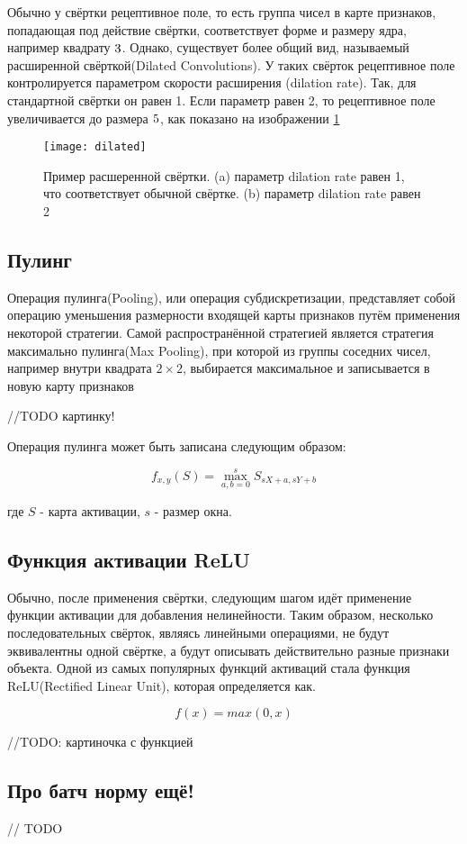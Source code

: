 Обычно у свёртки рецептивное поле, то есть группа чисел в карте признаков, попадающая под действие свёртки,
соответствует форме и размеру ядра, например квадрату $3 \time 3$. Однако, существует более общий вид,
называемый расширенной свёрткой(Dilated Convolutions)\cite{Dilated}. У таких свёрток рецептивное поле контролируется параметром скорости
расширения (dilation rate). Так, для стандартной свёртки он равен 1. Если параметр равен 2, то рецептивное поле увеличивается
до размера $5 \time 5$, как показано на изображении \ref{fig:dilated}


\begin{figure}[h]
    \centering
    \texttt{[image: dilated]}
    \caption{Пример расшеренной свёртки. (a) параметр dilation rate равен 1, что соответствует обычной свёртке. (b) параметр dilation rate равен 2}
    \label{fig:dilated}
\end{figure}

\subsection{Пулинг}

Операция пулинга(Pooling), или операция субдискретизации, представляет собой операцию уменьшения размерности входящей карты признаков 
путём применения некоторой стратегии. Самой распространённой стратегией является стратегия максимально пулинга(Max Pooling),
при которой из группы соседних чисел, например внутри квадрата $2 \times 2$, выбирается максимальное и записывается в новую
карту признаков 

//TODO картинку!

Операция пулинга может быть записана следующим образом:

\begin{equation}
    f_{x,y}(S) = \max_{a,b=0}^{s}S_{sX+a, sY+b}
\end{equation}

где $S$ - карта активации, $s$ - размер окна.

\subsection{Функция активации ReLU}

Обычно, после применения свёртки, следующим шагом идёт применение функции активации для добавления нелинейности. Таким образом,
несколько последовательных свёрток, являясь линейными операциями, не будут эквивалентны одной свёртке, а будут описывать действительно 
разные признаки объекта. Одной из самых популярных функций активаций стала функция ReLU(Rectified Linear Unit), которая определяется
как.

\begin{equation}
    f(x) = max(0,x)
\end{equation}

//TODO: картиночка с функцией


\subsection{Про батч норму ещё!}
// TODO